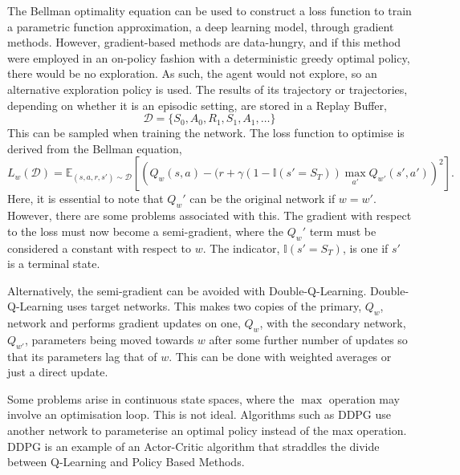 The Bellman optimality equation can be used to construct a loss function to train a parametric function approximation, a deep learning model, through gradient methods. However, gradient-based methods are data-hungry, and if this method were employed in an on-policy fashion with a deterministic greedy optimal policy, there would be no exploration. As such, the agent would not explore, so an alternative exploration policy is used. The results of its trajectory or trajectories, depending on whether it is an episodic setting, are stored in a Replay Buffer,
\begin{equation}
	\mathcal{D} = \{S_0, A_0, R_1, S_1, A_1, \ldots \}
\end{equation}
This can be sampled when training the network. The loss function to optimise is derived from the Bellman equation,
\begin{equation}
	L_{w}(\mathcal{D}) = \mathbb{E}_{(s,a,r,s') \sim \mathcal{D}}\left[\left(Q_w(s,a) -(r + \gamma(1-\mathbb{I}(s'= S_{T}))\max_{a'}Q_{w'}(s', a')\right)^2\right].
\end{equation}
Here, it is essential to note that $Q_w'$ can be the original network if $w = w'$. However, there are some problems associated with this. The gradient with respect to the loss must now become a semi-gradient, where the $Q_w'$ term must be considered a constant with respect to $w$. The indicator, $\mathbb{I}(s' = S_T)$,  is one if $s'$ is a terminal state.

Alternatively, the semi-gradient can be avoided with Double-Q-Learning. Double-Q-Learning uses target networks\cite{van2016deep}. This makes two copies of the primary, $Q_w$, network and performs gradient updates on one, $Q_w$, with the secondary network, $Q_{w'}$, parameters being moved towards $w$ after some further number of updates so that its parameters lag that of $w$. This can be done with weighted averages or just a direct update.

Some problems arise in continuous state spaces, where the $\max$ operation may involve an optimisation loop. This is not ideal. Algorithms such as DDPG\cite{lillicrap2015continuous} use another network to parameterise an optimal policy instead of the max operation. DDPG is an example of an Actor-Critic algorithm that straddles the divide between Q-Learning and Policy Based Methods.


